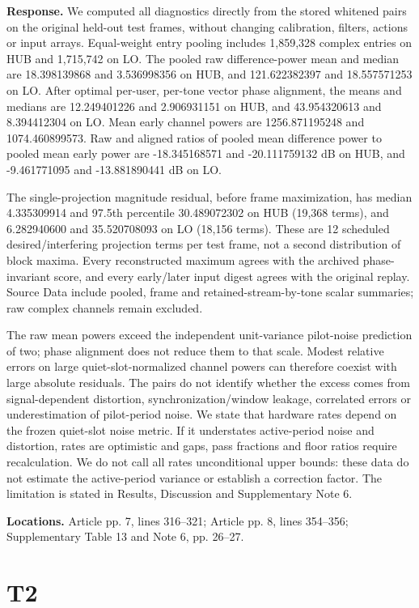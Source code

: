 \documentclass[10pt,letterpaper]{article}
\begin{document}
\textbf{Response.} We computed all diagnostics directly from the stored whitened pairs on the original held-out test frames, without changing calibration, filters, actions or input arrays. Equal-weight entry pooling includes 1,859,328 complex entries on HUB and 1,715,742 on LO. The pooled raw difference-power mean and median are 18.398139868 and 3.536998356 on HUB, and 121.622382397 and 18.557571253 on LO. After optimal per-user, per-tone vector phase alignment, the means and medians are 12.249401226 and 2.906931151 on HUB, and 43.954320613 and 8.394412304 on LO. Mean early channel powers are 1256.871195248 and 1074.460899573. Raw and aligned ratios of pooled mean difference power to pooled mean early power are -18.345168571 and -20.111759132 dB on HUB, and -9.461771095 and -13.881890441 dB on LO.

The single-projection magnitude residual, before frame maximization, has median 4.335309914 and 97.5th percentile 30.489072302 on HUB (19,368 terms), and 6.282940600 and 35.520708093 on LO (18,156 terms). These are 12 scheduled desired/interfering projection terms per test frame, not a second distribution of block maxima. Every reconstructed maximum agrees with the archived phase-invariant score, and every early/later input digest agrees with the original replay. Source Data include pooled, frame and retained-stream-by-tone scalar summaries; raw complex channels remain excluded.

The raw mean powers exceed the independent unit-variance pilot-noise prediction of two; phase alignment does not reduce them to that scale. Modest relative errors on large quiet-slot-normalized channel powers can therefore coexist with large absolute residuals. The pairs do not identify whether the excess comes from signal-dependent distortion, synchronization/window leakage, correlated errors or underestimation of pilot-period noise. We state that hardware rates depend on the frozen quiet-slot noise metric. If it understates active-period noise and distortion, rates are optimistic and gaps, pass fractions and floor ratios require recalculation. We do not call all rates unconditional upper bounds: these data do not estimate the active-period variance or establish a correction factor. The limitation is stated in Results, Discussion and Supplementary Note 6.

\textbf{Locations.} Article pp. 7, lines 316–321; Article pp. 8, lines 354–356; Supplementary Table 13 and Note 6, pp. 26–27.

\section*{T2}
\end{document}
